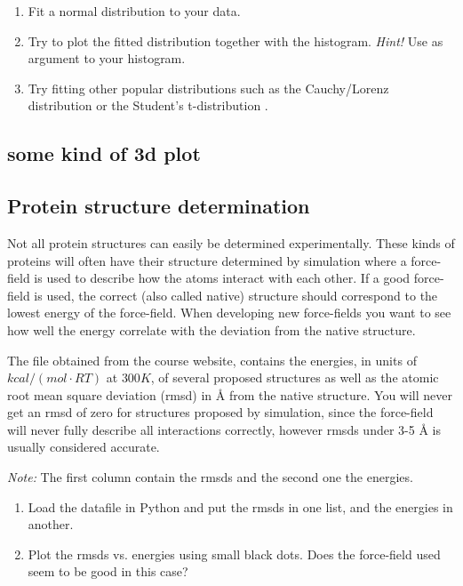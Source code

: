 \documentclass{article}
\begin{document}
\begin{enumerate}[resume]

    \item Fit a normal distribution to your data.

    \item Try to plot the fitted distribution together with the histogram. \emph{Hint!} Use  as argument to your histogram.

    \item Try fitting other popular distributions such as the Cauchy/Lorenz distribution  or the Student's t-distribution .

\end{enumerate}

\subsection{some kind of 3d plot}


\subsection{Protein structure determination}

Not all protein structures can easily be determined experimentally.
These kinds of proteins will often have their structure determined by simulation where a force-field is used to describe how the atoms interact with each other.
If a good force-field is used, the correct (also called native) structure should correspond to the lowest energy of the force-field.
When developing new force-fields you want to see how well the energy correlate with the deviation from the native structure.

The file  obtained from the course website, contains the energies, in units of $kcal/(mol\cdot RT)$ at $300K$, of several proposed structures as well as the atomic root mean square deviation (rmsd) in Å from the native structure.
You will never get an rmsd of zero for structures proposed by simulation, since the force-field will never fully describe all interactions correctly, however rmsds under 3-5 Å is usually considered accurate.

\emph{Note:} The first column contain the rmsds and the second one the energies.


\begin{enumerate}[start=1]

    \item Load the datafile in Python and put the rmsds in one list, and the energies in another.

    \item Plot the rmsds vs. energies using small black dots. Does the force-field used seem to be good in this case?

\end{enumerate}
\end{document}
